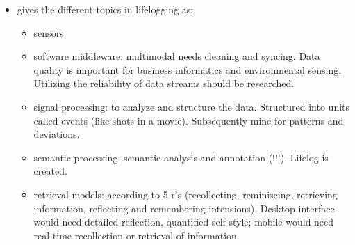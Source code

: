 \begin{itemize}
	\item \cite{gurrin2014lifelogging} gives the different topics in lifelogging as:
	\begin{itemize}
		\item sensors
		\item software middleware: multimodal needs cleaning and syncing. Data quality is important for business informatics and environmental sensing. Utilizing the reliability of data streams should be researched.
		\item signal processing: to analyze and structure the data. Structured into units called events (like shots in a movie). Subsequently mine for patterns and deviations.
		\item semantic processing: semantic analysis and annotation (!!!). Lifelog is created.
		\item retrieval models: according to 5 r's (recollecting, reminiscing, retrieving information, reflecting and remembering intensions). Desktop interface would need detailed reflection, quantified-self style; mobile would need real-time recollection or retrieval of information.
		

\end{itemize}
\end{itemize}
